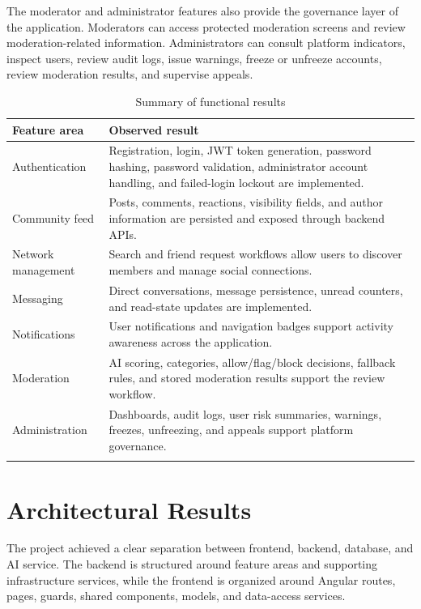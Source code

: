 The moderator and administrator features also provide the governance layer of the application. Moderators can access protected moderation screens and review moderation-related information. Administrators can consult platform indicators, inspect users, review audit logs, issue warnings, freeze or unfreeze accounts, review moderation results, and supervise appeals.

\begin{longtable}{|m{4.5cm}|m{9.8cm}|}
\hline
\textbf{Feature area} & \textbf{Observed result} \\
\hline
Authentication & Registration, login, JWT token generation, password hashing, password validation, administrator account handling, and failed-login lockout are implemented. \\
\hline
Community feed & Posts, comments, reactions, visibility fields, and author information are persisted and exposed through backend APIs. \\
\hline
Network management & Search and friend request workflows allow users to discover members and manage social connections. \\
\hline
Messaging & Direct conversations, message persistence, unread counters, and read-state updates are implemented. \\
\hline
Notifications & User notifications and navigation badges support activity awareness across the application. \\
\hline
Moderation & AI scoring, categories, allow/flag/block decisions, fallback rules, and stored moderation results support the review workflow. \\
\hline
Administration & Dashboards, audit logs, user risk summaries, warnings, freezes, unfreezing, and appeals support platform governance. \\
\hline
\caption{Summary of functional results}\\
\end{longtable}

\section{Architectural Results}

The project achieved a clear separation between frontend, backend, database, and AI service. The backend is structured around feature areas and supporting infrastructure services, while the frontend is organized around Angular routes, pages, guards, shared components, models, and data-access services.

